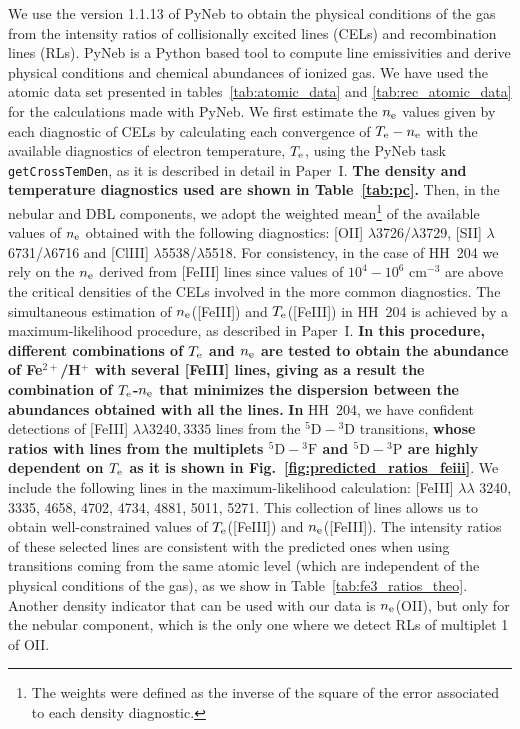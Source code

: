 \documentclass[twocolumn,linenumbers]{aastex63}
\begin{document}
We use the version 1.1.13 of PyNeb \citep{Luridiana15} to obtain the physical conditions of the gas from the intensity ratios of collisionally excited lines (CELs) and recombination lines (RLs). PyNeb is a Python based tool to compute line emissivities and derive physical conditions and chemical abundances of ionized gas. We have used the atomic data set presented in tables~\ref{tab:atomic_data} and \ref{tab:rec_atomic_data} for the calculations made with PyNeb. We first estimate the $n_{\rm e}$ values given by each diagnostic of CELs by calculating each convergence of $T_{\rm e}-n_{\rm e}$ with the available diagnostics of electron temperature, $T_{\rm e}$, using the PyNeb task \texttt{getCrossTemDen}, as it is described in detail in Paper~I. {\bf The density and temperature diagnostics used are shown in Table~\ref{tab:pc}.} Then, in the nebular and DBL components, we adopt the weighted mean\footnote{The weights were defined as the inverse of the square of the error associated to each density diagnostic.} of the available values of $n_{\rm e}$ obtained with the following diagnostics: [O\thinspace II] $\lambda$3726/$\lambda$3729, [S\thinspace II] $\lambda$6731/$\lambda$6716 and [Cl\thinspace III] $\lambda$5538/$\lambda$5518. For consistency, in the case of HH~204 we rely on the $n_{\rm e}$ derived from [Fe\thinspace III] lines since values of $10^4-10^6 \text{ cm}^{-3}$ are above the critical densities of the CELs involved in the more common diagnostics. The simultaneous estimation of $n_{\rm e}$([Fe\thinspace III]) and $T_{\rm e}$([Fe\thinspace III]) in HH~204 is achieved by a maximum-likelihood procedure, as described in Paper~I. {\bf In this procedure, different combinations of $T_{\rm e}$ and $n_{\rm e}$ are tested to obtain the abundance of Fe$^{2+}$/H$^{+}$ with several [Fe\thinspace III] lines, giving as a result the combination of $T_{\rm e}$-$n_{\rm e}$ that minimizes the dispersion between the abundances obtained with all the lines.} {\bf In} HH~204, we have confident detections of [Fe\thinspace III] $\lambda \lambda 3240, 3335$ lines from the $^5\text{D}-{^3}\text{D}$ transitions, {\bf whose ratios with lines from the multiplets $^5\text{D}-{^3}\text{F}$ and $^5\text{D}-{^3}\text{P}$ are highly dependent on $T_{\rm e}$ as it is shown in Fig.~\ref{fig:predicted_ratios_feiii}}. We include the following lines in the maximum-likelihood calculation: [Fe\thinspace III] $\lambda \lambda$ 3240, 3335, 4658, 4702, 4734, 4881, 5011, 5271. This collection of lines allows us to obtain well-constrained values of $T_{\rm e}$([Fe\thinspace III]) and $n_{\rm e}$([Fe\thinspace III]). The intensity ratios of these selected lines are consistent with the predicted ones when using transitions coming from the same atomic level (which are independent of the physical conditions of the gas), as we  show in Table~\ref{tab:fe3_ratios_theo}. %
Another density indicator that can be used with our data is $n_{\rm e}$(O\thinspace II), but only for the nebular component, which is the only one where we detect RLs of multiplet 1 of O\thinspace II.
\end{document}
